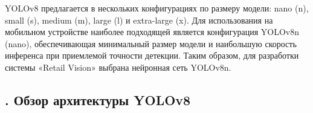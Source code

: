 {  \par \redline YOLOv8 предлагается в нескольких конфигурациях по размеру модели: nano (n), small (s), medium (m), large (l) и extra-large (x). Для использования на мобильном устройстве наиболее подходящей является конфигурация YOLOv8n (nano), обеспечивающая минимальный размер модели и наибольшую скорость инференса при приемлемой точности детекции. Таким образом, для разработки системы «Retail Vision» выбрана нейронная сеть YOLOv8n.

  \par
}

\subtitlespace

\subsection*{ 
  \gostTitleFont
  \redline
  \thechaptercntr .\thesubchaptercntr \spc 
  Обзор архитектуры YOLOv8
} \addtocounter{subchaptercntr}{1} 
  
\subtitlespace
  
